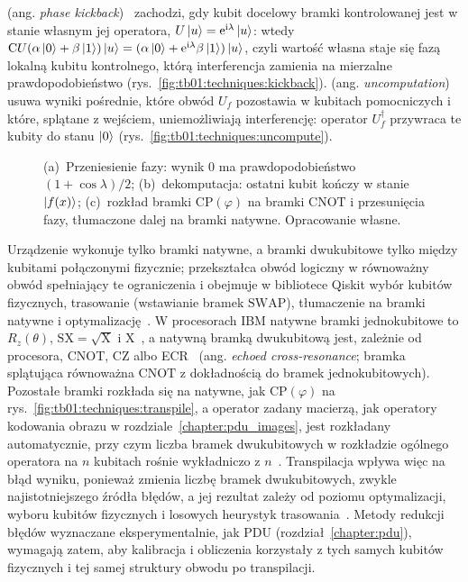  (ang. \emph{phase kickback})~\cite{cleve_quantum_1998} zachodzi, gdy kubit docelowy bramki kontrolowanej jest w stanie własnym jej operatora, $U\ket{u}=\mathrm{e}^{\mathrm{i}\lambda}\ket{u}$: wtedy $\mathrm{C}U(\alpha\ket{0}+\beta\ket{1})\ket{u}=(\alpha\ket{0}+\mathrm{e}^{\mathrm{i}\lambda}\beta\ket{1})\ket{u}$, czyli wartość własna staje się fazą lokalną kubitu kontrolnego, którą interferencja zamienia na mierzalne prawdopodobieństwo (rys.~\ref{fig:tb01:techniques:kickback}).
 (ang. \emph{uncomputation})~\cite{bennett_logical_1973} usuwa wyniki pośrednie, które obwód $U_f$ pozostawia w kubitach pomocniczych i które, splątane z wejściem, uniemożliwiają interferencję: operator $U_f^\dagger$ przywraca te kubity do stanu $\ket{0}$ (rys.~\ref{fig:tb01:techniques:uncompute}).

\begin{figure}[tb]
  \centering
  
  \caption[Przeniesienie fazy, dekomputacja i rozkład bramki $\mathrm{CP}(\varphi)$]{(a)~Przeniesienie fazy: wynik 0 ma prawdopodobieństwo $(1+\cos\lambda)/2$; (b)~dekomputacja: ostatni kubit kończy w stanie $\ket{f(x)}$; (c)~rozkład bramki $\mathrm{CP}(\varphi)$ na bramki $\mathrm{CNOT}$ i przesunięcia fazy, tłumaczone dalej na bramki natywne.
  Opracowanie własne.}
  \label{fig:tb01:techniques}
\end{figure}

Urządzenie wykonuje tylko bramki natywne, a bramki dwukubitowe tylko między kubitami połączonymi fizycznie;  przekształca obwód logiczny w równoważny obwód spełniający te ograniczenia i obejmuje w bibliotece Qiskit wybór kubitów fizycznych, trasowanie (wstawianie bramek $\mathrm{SWAP}$), tłumaczenie na bramki natywne i optymalizację~\cite{javadi-abhari_quantum_2024,qiskit-optimization-level}.
W procesorach IBM natywne bramki jednokubitowe to $R_z(\theta)$, $\mathrm{SX}=\sqrt{\mathrm{X}}$ i $\mathrm{X}$~\cite{raubitzek_quantum_noise}, a natywną bramką dwukubitową jest, zależnie od procesora, $\mathrm{CNOT}$, $\mathrm{CZ}$ albo ECR~\cite{qiskit_ibm_runtime_2026} (ang. \emph{echoed cross-resonance}; bramka splątująca równoważna $\mathrm{CNOT}$ z dokładnością do bramek jednokubitowych).
Pozostałe bramki rozkłada się na natywne, jak $\mathrm{CP}(\varphi)$ na rys.~\ref{fig:tb01:techniques:transpile}, a operator zadany macierzą, jak operatory kodowania obrazu w rozdziale~\ref{chapter:pdu_images}, jest rozkładany automatycznie, przy czym liczba bramek dwukubitowych w rozkładzie ogólnego operatora na $n$ kubitach rośnie wykładniczo z $n$~\cite{shende_synthesis_2006}.
Transpilacja wpływa więc na błąd wyniku, ponieważ zmienia liczbę bramek dwukubitowych, zwykle najistotniejszego źródła błędów, a jej rezultat zależy od poziomu optymalizacji, wyboru kubitów fizycznych i losowych heurystyk trasowania~\cite{qiskit-optimization-level,javadi-abhari_quantum_2024}.
Metody redukcji błędów wyznaczane eksperymentalnie, jak PDU (rozdział~\ref{chapter:pdu}), wymagają zatem, aby kalibracja i obliczenia korzystały z tych samych kubitów fizycznych i tej samej struktury obwodu po transpilacji.

